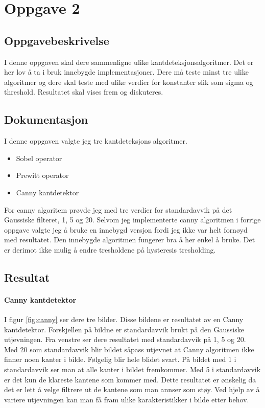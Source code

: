 \documentclass[a4paper, 12pt]{article}
\begin{document}
\section{Oppgave 2}
\subsection{Oppgavebeskrivelse}
I denne oppgaven skal dere sammenligne ulike kantdeteksjonsalgoritmer. Det er her lov å ta i bruk innebygde implementasjoner. Dere må teste minst tre ulike algoritmer og dere skal teste med ulike verdier for konstanter slik som sigma og threshold. Resultatet skal vises frem og diskuteres.

\subsection{Dokumentasjon}
I denne oppgaven valgte jeg tre kantdeteksjons algoritmer.
\begin{itemize}
\item Sobel operator
\item Prewitt operator
\item Canny kantdetektor
\end{itemize}

For canny algoritem prøvde jeg med tre verdier for standardavvik på det Gaussiske filteret, 1, 5 og 20. Selvom jeg implementerte canny algoritmen i forrige oppgave valgte jeg å bruke en innebygd versjon fordi jeg ikke var helt fornøyd med resultatet. Den innebygde algoritmen fungerer bra å her enkel å bruke. Det er derimot ikke mulig å endre tresholdene på hysteresis tresholding.

\subsection{Resultat}
\paragraph{Canny kantdetektor}I figur \ref{fig:canny} ser dere tre bilder. Disse bildene er resultatet av en Canny kantdetektor. Forskjellen på bildne er standardavvik brukt på den Gaussiske utjevningen. Fra venstre ser dere resultatet med standardavvik på 1, 5 og 20. Med 20 som standardavvik blir bildet såpass utjevnet at Canny algoritmen ikke finner noen kanter i bilde. Følgelig blir hele blidet svart. På bildet med 1 i standardavvik ser man at alle kanter i bildet fremkommer. Med 5 i standardavvik er det kun de klareste kantene som kommer med. Dette resultatet er ønskelig da det er lett å velge filtrere ut de kantene som man annser som støy. Ved hjelp av å variere utjevningen kan man få fram ulike karakteristikker i bilde etter behov.
\end{document}
